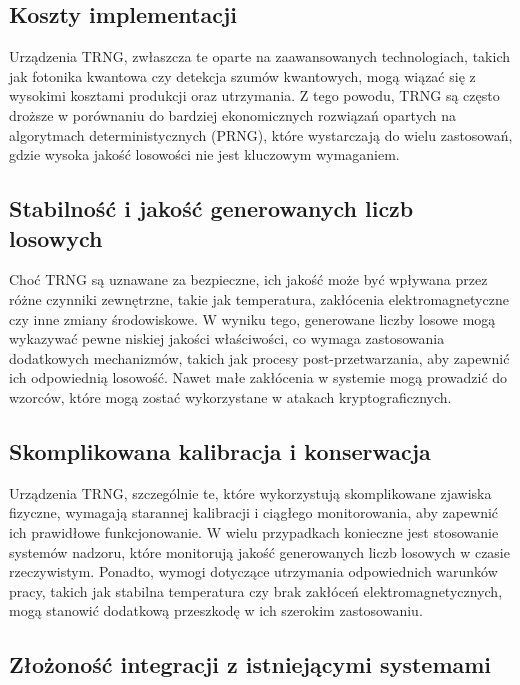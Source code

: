 \subsection{Koszty implementacji}

Urządzenia TRNG, zwłaszcza te oparte na zaawansowanych technologiach, takich jak fotonika kwantowa czy detekcja szumów kwantowych, mogą wiązać się z wysokimi kosztami produkcji oraz utrzymania. Z tego powodu, TRNG są często droższe w porównaniu do bardziej ekonomicznych rozwiązań opartych na algorytmach deterministycznych (PRNG), które wystarczają do wielu zastosowań, gdzie wysoka jakość losowości nie jest kluczowym wymaganiem.

\subsection{Stabilność i jakość generowanych liczb losowych}

Choć TRNG są uznawane za bezpieczne, ich jakość może być wpływana przez różne czynniki zewnętrzne, takie jak temperatura, zakłócenia elektromagnetyczne czy inne zmiany środowiskowe. W wyniku tego, generowane liczby losowe mogą wykazywać pewne niskiej jakości właściwości, co wymaga zastosowania dodatkowych mechanizmów, takich jak procesy post-przetwarzania, aby zapewnić ich odpowiednią losowość. Nawet małe zakłócenia w systemie mogą prowadzić do wzorców, które mogą zostać wykorzystane w atakach kryptograficznych.

\subsection{Skomplikowana kalibracja i konserwacja}

Urządzenia TRNG, szczególnie te, które wykorzystują skomplikowane zjawiska fizyczne, wymagają starannej kalibracji i ciągłego monitorowania, aby zapewnić ich prawidłowe funkcjonowanie. W wielu przypadkach konieczne jest stosowanie systemów nadzoru, które monitorują jakość generowanych liczb losowych w czasie rzeczywistym. Ponadto, wymogi dotyczące utrzymania odpowiednich warunków pracy, takich jak stabilna temperatura czy brak zakłóceń elektromagnetycznych, mogą stanowić dodatkową przeszkodę w ich szerokim zastosowaniu.

\subsection{Złożoność integracji z istniejącymi systemami}

